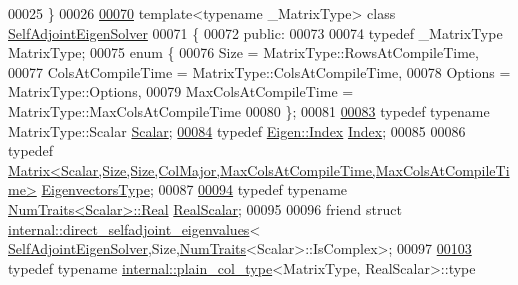 \begin{DoxyCode}
00025 \}
00026 
\hyperlink{group___eigenvalues___module}{00070} \textcolor{keyword}{template}<\textcolor{keyword}{typename} \_MatrixType> \textcolor{keyword}{class }\hyperlink{group___eigenvalues___module_class_eigen_1_1_self_adjoint_eigen_solver}{SelfAdjointEigenSolver}
00071 \{
00072   \textcolor{keyword}{public}:
00073 
00074     \textcolor{keyword}{typedef} \_MatrixType MatrixType;
00075     \textcolor{keyword}{enum} \{
00076       Size = MatrixType::RowsAtCompileTime,
00077       ColsAtCompileTime = MatrixType::ColsAtCompileTime,
00078       Options = MatrixType::Options,
00079       MaxColsAtCompileTime = MatrixType::MaxColsAtCompileTime
00080     \};
00081     
\hyperlink{group___eigenvalues___module_a0bfcedf4245b6846007ca4f01e4feb1f}{00083}     \textcolor{keyword}{typedef} \textcolor{keyword}{typename} MatrixType::Scalar \hyperlink{group___eigenvalues___module_a0bfcedf4245b6846007ca4f01e4feb1f}{Scalar};
\hyperlink{group___eigenvalues___module_a8a59ab7734b6eae2754fd78bc7c3a360}{00084}     \textcolor{keyword}{typedef} \hyperlink{namespace_eigen_a62e77e0933482dafde8fe197d9a2cfde}{Eigen::Index} \hyperlink{group___eigenvalues___module_a8a59ab7734b6eae2754fd78bc7c3a360}{Index}; 
00085     
00086     \textcolor{keyword}{typedef} 
      \hyperlink{group___core___module}{Matrix<Scalar,Size,Size,ColMajor,MaxColsAtCompileTime,MaxColsAtCompileTime>}
       \hyperlink{group___core___module}{EigenvectorsType};
00087 
\hyperlink{group___eigenvalues___module_a5dae5f422a3c71060e6bd31332bf64fd}{00094}     \textcolor{keyword}{typedef} \textcolor{keyword}{typename} \hyperlink{group___core___module_struct_eigen_1_1_num_traits}{NumTraits<Scalar>::Real} \hyperlink{group___eigenvalues___module_a5dae5f422a3c71060e6bd31332bf64fd}{RealScalar};
00095     
00096     \textcolor{keyword}{friend} \textcolor{keyword}{struct }\hyperlink{struct_eigen_1_1internal_1_1direct__selfadjoint__eigenvalues}{internal::direct\_selfadjoint\_eigenvalues}<
      \hyperlink{group___eigenvalues___module_class_eigen_1_1_self_adjoint_eigen_solver}{SelfAdjointEigenSolver},Size,\hyperlink{group___core___module_struct_eigen_1_1_num_traits}{NumTraits}<Scalar>::IsComplex>;
00097 
\hyperlink{group___eigenvalues___module_acd090d5fdfc3cc017a13b6d8daa92287}{00103}     typedef typename \hyperlink{struct_eigen_1_1internal_1_1plain__col__type}{internal::plain\_col\_type}<MatrixType, RealScalar>::type 

\end{DoxyCode}
